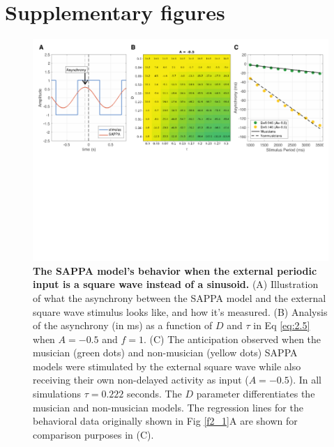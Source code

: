 \documentclass{report}
\begin{document}
\appendix
\chapter{Supplementary figures}
\begin{figure}
    \centering
    \includegraphics[width=1.0\textwidth]{figures/figS_1.png}
    \caption[The SAPPA model’s behavior when the external periodic input is a square wave instead of a sinusoid]{\textbf{The SAPPA model’s behavior when the external periodic input is a square wave instead of a sinusoid.} (A) Illustration of what the asynchrony between the SAPPA model and the external square wave stimulus looks like, and how it’s measured. (B) Analysis of the asynchrony (in ms) as a function of $D$ and $\tau$ in Eq \eqref{eq:2.5} when $A = -0.5$ and $f = 1$. (C) The anticipation observed when the musician (green dots) and non-musician (yellow dots) SAPPA models were stimulated by the external square wave while also receiving their own non-delayed activity as input ($A = -0.5$). In all simulations $\tau = 0.222$ seconds. The $D$ parameter differentiates the musician and non-musician models. The regression lines for the behavioral data originally shown in Fig \ref{f2_1}A are shown for comparison purposes in (C).}
    \label{fS_1}
\end{figure}
\end{document}
